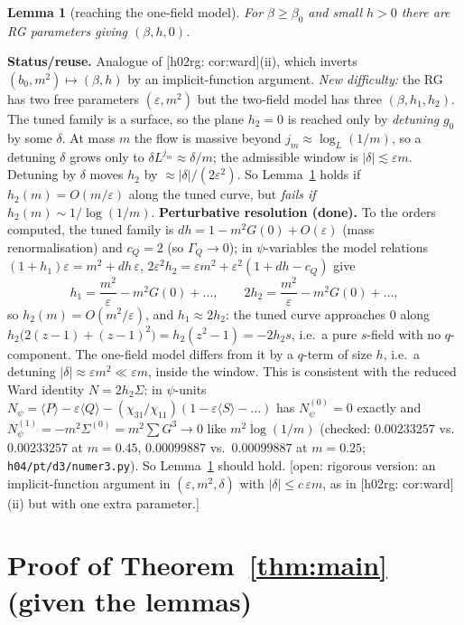 \documentclass[11pt]{article}
\newtheorem{lemma}[theorem]{Lemma}
\theoremstyle{definition}
\theoremstyle{remark}
\newcommand{\avg}[1]{\langle #1\rangle}
\newcommand{\eps}{\varepsilon}
\newcommand{\status}[1]{\par\smallskip\noindent\textbf{Status/reuse.} #1\par\smallskip}
\newcommand{\reuse}[1]{\textsf{[h02rg: #1]}}
\newcommand{\open}[1]{\textcolor{red!60!black}{\textsf{[open: #1]}}}
\begin{document}
\begin{lemma}[reaching the one-field model]\label{lem:onefield}
  For $\beta\ge\beta_0$ and small $h>0$ there are RG parameters giving $(\beta,h,0)$.
\end{lemma}
\status{Analogue of \reuse{cor:ward}(ii), which inverts $(b_0,m^2)\mapsto(\beta,h)$ by an
implicit-function argument. \emph{New difficulty:} the RG has two free parameters
$(\eps,m^2)$ but the two-field model has three $(\beta,h_1,h_2)$. The tuned family is a
surface, so the plane $h_2=0$ is reached only by \emph{detuning} $g_0$ by some $\delta$. At mass
$m$ the flow is massive beyond $j_m\approx\log_L(1/m)$, so a detuning $\delta$ grows only to
$\delta L^{j_m}\approx\delta/m$; the admissible window is $|\delta|\lesssim\eps m$. Detuning
by $\delta$ moves $h_2$ by $\approx|\delta|/(2\eps^2)$. So Lemma~\ref{lem:onefield} holds
if $h_2(m)=O(m/\eps)$ along the tuned curve, but \emph{fails if $h_2(m)\sim1/\log(1/m)$}.
\textbf{Perturbative resolution (done).} To the orders computed, the tuned family is
$dh=1-m^2G(0)+O(\eps)$ (mass renormalisation) and $c_Q=2$ (so $\Gamma_Q\to0$); in
$\psi$-variables the model relations $(1+h_1)\eps=m^2+dh\,\eps$,
$2\eps^2h_2=\eps m^2+\eps^2(1+dh-c_Q)$ give
\[
  h_1=\frac{m^2}{\eps}-m^2G(0)+\dots,\qquad 2h_2=\frac{m^2}{\eps}-m^2G(0)+\dots,
\]
so $h_2(m)=O(m^2/\eps)$, and $h_1\approx 2h_2$: the tuned curve approaches $0$ along
$h_2\big(2(z-1)+(z-1)^2\big)=h_2(z^2-1)=-2h_2s$, i.e.\ a pure $s$-field with no $q$-component.
The one-field model differs from it by a $q$-term of size $h$, i.e.\ a detuning
$|\delta|\approx\eps m^2\ll\eps m$, inside the window. This is consistent with the reduced
Ward identity $N=2h_2\Sigma$: in $\psi$-units $N_\psi=\avg{P}-\eps\avg{Q}-(\chi_{31}/\chi_{11})(1-\eps\avg S-\dots)$
has $N_\psi^{(0)}=0$ exactly and $N_\psi^{(1)}=-m^2\Sigma^{(0)}=m^2\sum G^3\to0$ like $m^2\log(1/m)$
(checked: $0.00233257$ vs.\ $0.00233257$ at $m=0.45$, $0.00099887$ vs.\ $0.00099887$ at
$m=0.25$; \texttt{h04/pt/d3/numer3.py}). So Lemma~\ref{lem:onefield} should hold.
\open{rigorous version: an implicit-function argument in $(\eps,m^2,\delta)$ with
$|\delta|\le c\,\eps m$, as in \reuse{cor:ward}(ii) but with one extra parameter.}}

\section{Proof of Theorem~\ref{thm:main} (given the lemmas)}
\end{document}
